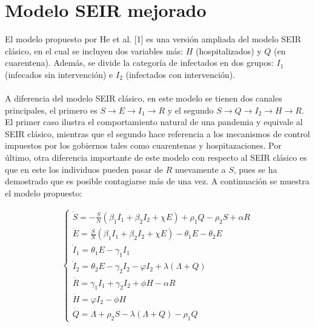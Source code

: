 \documentclass[conference]{IEEEtran}
\begin{document}
\section{Modelo SEIR mejorado}

El modelo propuesto por He et al. [1] es una versión ampliada del modelo SEIR clásico, en el cual 
se incluyen dos variables más: $H$ (hospitalizados) y $Q$ (en cuarentena). Además, se
divide la categoría de infectados en dos grupos: $I_1$ (infecados sin intervención)
e $I_2$ (infectados con intervención).
\\\\
A diferencia del modelo SEIR clásico, en este modelo se tienen dos canales principales,
el primero es $S \rightarrow E \rightarrow I_1 \rightarrow R$ y el segundo
$S \rightarrow Q \rightarrow I_2 \rightarrow H \rightarrow R$. El primer 
caso ilustra el comportamiento natural de una pandemia y equivale al SEIR clásico, 
mientras que el segundo hace referencia a los mecanismos de control impuestos por los
gobiernos tales como cuarentenas y hospitazaciones. Por último, otra diferencia 
importante de este modelo con respecto al SEIR clásico es que en este los individuos
pueden pasar de $R$ nuevamente a $S$, pues se ha demostrado que es posible
contagiarse más de una vez. A continuación se muestra el modelo propuesto:

\begin{equation}   
    \begin{aligned}
    \left\{
        \begin{array}{l} 
        \dot{S} = - \frac{S}{N}\left( {{\beta _1}{I_1} + {\beta _2}{I_2} + \chi E} \right) + {\rho _1}Q - {\rho _2}S + \alpha R
        \\ 
        \dot{ E} = \frac{S}{N}\left( {{\beta _1}{I_1} + {\beta _2}{I_2} + \chi E} \right) - {\theta _1}E - {\theta _2}E
        \\ 
        {\dot{I}}_1 = {\theta _1}E - {\gamma _1}{I_1}
        \\ 
        \dot{I}_2 = {\theta _2}E - {\gamma _2}{I_2} - \varphi {I_2} + \lambda \left( \varLambda + Q \right) 
        \\ 
        \dot{R} = {\gamma _1}{I_1} + {\gamma _2}{I_2} + \phi H - \alpha R
        \\ 
        \dot{H} = \varphi {I_2} - \phi H
        \\ 
        \dot{Q} = \varLambda + {\rho _2}S - \lambda \left( {\varLambda + Q} \right) - {\rho _1}Q 
    \end{array} 
    \right.
    \end{aligned}
\end{equation}
\end{document}
